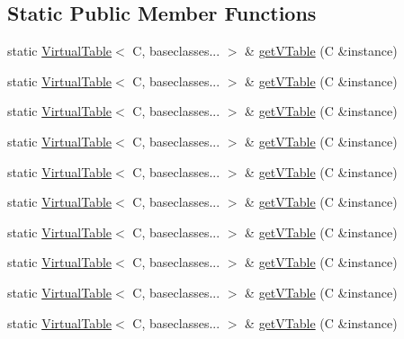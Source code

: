 \subsection*{Static Public Member Functions}
\begin{DoxyCompactItemize}
\item 
static \mbox{\hyperlink{structfakeit_1_1VirtualTable}{Virtual\+Table}}$<$ C, baseclasses... $>$ \& \mbox{\hyperlink{structfakeit_1_1VirtualTable_a97ed785e28eccb86808dbc48286eb66d}{get\+V\+Table}} (C \&instance)
\item 
static \mbox{\hyperlink{structfakeit_1_1VirtualTable}{Virtual\+Table}}$<$ C, baseclasses... $>$ \& \mbox{\hyperlink{structfakeit_1_1VirtualTable_a97ed785e28eccb86808dbc48286eb66d}{get\+V\+Table}} (C \&instance)
\item 
static \mbox{\hyperlink{structfakeit_1_1VirtualTable}{Virtual\+Table}}$<$ C, baseclasses... $>$ \& \mbox{\hyperlink{structfakeit_1_1VirtualTable_a97ed785e28eccb86808dbc48286eb66d}{get\+V\+Table}} (C \&instance)
\item 
static \mbox{\hyperlink{structfakeit_1_1VirtualTable}{Virtual\+Table}}$<$ C, baseclasses... $>$ \& \mbox{\hyperlink{structfakeit_1_1VirtualTable_a97ed785e28eccb86808dbc48286eb66d}{get\+V\+Table}} (C \&instance)
\item 
static \mbox{\hyperlink{structfakeit_1_1VirtualTable}{Virtual\+Table}}$<$ C, baseclasses... $>$ \& \mbox{\hyperlink{structfakeit_1_1VirtualTable_a97ed785e28eccb86808dbc48286eb66d}{get\+V\+Table}} (C \&instance)
\item 
static \mbox{\hyperlink{structfakeit_1_1VirtualTable}{Virtual\+Table}}$<$ C, baseclasses... $>$ \& \mbox{\hyperlink{structfakeit_1_1VirtualTable_a97ed785e28eccb86808dbc48286eb66d}{get\+V\+Table}} (C \&instance)
\item 
static \mbox{\hyperlink{structfakeit_1_1VirtualTable}{Virtual\+Table}}$<$ C, baseclasses... $>$ \& \mbox{\hyperlink{structfakeit_1_1VirtualTable_a97ed785e28eccb86808dbc48286eb66d}{get\+V\+Table}} (C \&instance)
\item 
static \mbox{\hyperlink{structfakeit_1_1VirtualTable}{Virtual\+Table}}$<$ C, baseclasses... $>$ \& \mbox{\hyperlink{structfakeit_1_1VirtualTable_a97ed785e28eccb86808dbc48286eb66d}{get\+V\+Table}} (C \&instance)
\item 
static \mbox{\hyperlink{structfakeit_1_1VirtualTable}{Virtual\+Table}}$<$ C, baseclasses... $>$ \& \mbox{\hyperlink{structfakeit_1_1VirtualTable_a97ed785e28eccb86808dbc48286eb66d}{get\+V\+Table}} (C \&instance)
\item 
static \mbox{\hyperlink{structfakeit_1_1VirtualTable}{Virtual\+Table}}$<$ C, baseclasses... $>$ \& \mbox{\hyperlink{structfakeit_1_1VirtualTable_a97ed785e28eccb86808dbc48286eb66d}{get\+V\+Table}} (C \&instance)
\end{DoxyCompactItemize}
